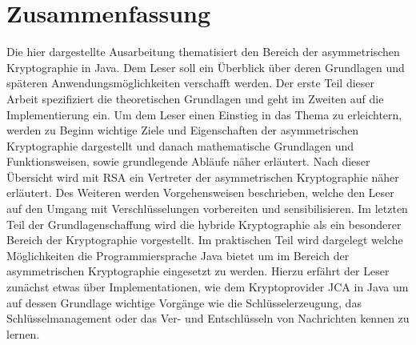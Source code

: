 \documentclass[paper=a4,11pt,german]{scrartcl} %
\begin{document}
\section{Zusammenfassung}
Die hier dargestellte Ausarbeitung thematisiert den Bereich der asymmetrischen Kryptographie in Java. Dem Leser soll ein Überblick über deren Grundlagen und späteren Anwendungsmöglichkeiten verschafft werden. Der erste Teil dieser Arbeit spezifiziert die theoretischen Grundlagen und geht im Zweiten auf die Implementierung ein. Um dem Leser einen Einstieg in das Thema zu erleichtern, werden zu Beginn wichtige Ziele und Eigenschaften der asymmetrischen Kryptographie dargestellt und danach mathematische Grundlagen und Funktionsweisen, sowie grundlegende Abläufe näher erläutert. Nach dieser Übersicht wird mit RSA ein Vertreter der asymmetrischen Kryptographie näher erläutert. Des Weiteren werden Vorgehensweisen beschrieben, welche den Leser auf den Umgang mit Verschlüsselungen vorbereiten und sensibilisieren. Im letzten Teil der Grundlagenschaffung wird die hybride Kryptographie als ein besonderer Bereich der Kryptographie vorgestellt. Im praktischen Teil wird dargelegt welche Möglichkeiten die Programmiersprache Java bietet um im Bereich der asymmetrischen Kryptographie eingesetzt zu werden. Hierzu erfährt der Leser zunächst etwas über Implementationen, wie dem Kryptoprovider JCA in Java um auf dessen Grundlage wichtige Vorgänge wie die Schlüsselerzeugung, das Schlüsselmanagement oder das Ver- und Entschlüsseln von Nachrichten kennen zu lernen. 



\end{document}
